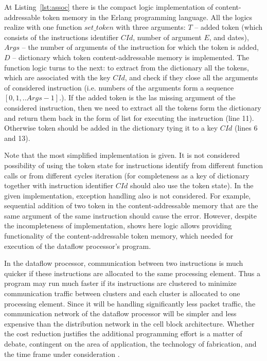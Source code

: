 \documentclass[
11pt,%
tightenlines,%
twoside,%
onecolumn,%
nofloats,%
nobibnotes,%
nofootinbib,%
superscriptaddress,%
noshowpacs,%
centertags]%
{revtex4}
\begin{document}
At Listing~\ref{lst:assoc} there is the compact logic implementation of content-addressable token memory in the Erlang programming language. All the logics realize with one function $set\_token$ with three arguments: $T$ -- added token (which consists of the instructions identifier $CId$, number of argument $E$, and dates), $Args$ -- the number of arguments of the instruction for which the token is added, $D$ -- dictionary which token content-addressable memory is implemented. The function logic turns to the next: to extract from the dictionary all the tokens, which are associated with the key $CId$, and check if they close all the arguments of considered instruction (i.e. numbers of the arguments form a sequence $[0, 1, .. Args - 1]$.). If the added token is the las missing argument of the considered instruction, then we need to extract all the tokens form the dictionary and return them back in the form of list for executing the instruction (line 11). Otherwise token should be added in the dictionary tying it to a key $CId$ (lines 6 and 13).

Note that the most simplified implementation is given. It is not considered possibility of using the token state for instructions identify from different function calls or from different cycles iteration (for completeness as a key of dictionary together with instruction identifier $CId$ should also use the token state). In the given implementation, exception handling also is not considered. For example, sequential addition of two token in the content-addressable memory that are the same argument of the same instruction should cause the error. However, despite the incompleteness of implementation, shows here logic allows providing functionality of the content-addressable token memory, which needed for execution of the dataflow processor’s program.

In the dataflow processor, communication between two instructions is much quicker if these instructions are allocated to the same processing element. Thus a program may run much faster if its instructions are clustered to minimize communication traffic between clusters and each cluster is allocated to one processing element. Since it will be handling significantly less packet traffic, the communication network of the dataflow processor will be simpler and less expensive than the distribution network in the cell block architecture. Whether the cost reduction justifies the additional programming effort is a matter of debate, contingent on the area of application, the technology of fabrication, and the time frame under consideration \cite{Dennis}.
\end{document}
